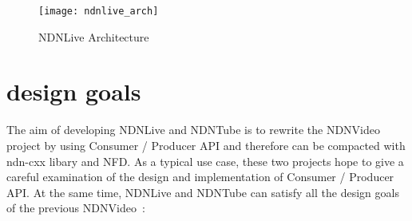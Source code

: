 
\begin{figure*}
  \centering
  \texttt{[image: ndnlive\_arch]}
  \caption{NDNLive Architecture}
  \label{fig:ndnlive_arch}
\end{figure*}

\vspace{0.3cm}
\section{design goals} %
\label{sec:design_goals}
The aim of developing NDNLive and NDNTube is to rewrite the NDNVideo project by using Consumer / Producer API and therefore can be compacted with ndn-cxx libary\cite{ndn-cxx} and NFD\cite{nfd-guide}. As a typical use case, these two projects hope to give a careful examination of the design and implementation of Consumer / Producer API. At the same time, NDNLive and NDNTube can satisfy all the design goals of the previous NDNVideo~\cite{ndnvideo}:

